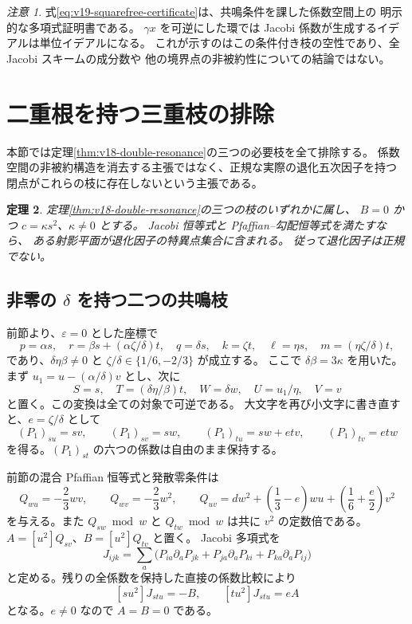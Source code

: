 \documentclass[11pt,a4paper]{ltjsarticle}
\newtheorem{theorem}{定理}[section]
\theoremstyle{remark}\newtheorem{remark}[theorem]{注意}
\begin{document}
\begin{remark}
式\eqref{eq:v19-squarefree-certificate}は、共鳴条件を課した係数空間上の
明示的な多項式証明書である。
$\gamma x$ を可逆にした環では Jacobi 係数が生成するイデアルは単位イデアルになる。
これが示すのはこの条件付き枝の空性であり、全 Jacobi スキームの成分数や
他の境界点の非被約性についての結論ではない。
\end{remark}


\section{二重根を持つ三重枝の排除}
\label{sec:v19-double-root}

本節では定理\ref{thm:v18-double-resonance}の三つの必要枝を全て排除する。
係数空間の非被約構造を消去する主張ではなく、正規な実際の退化五次因子を持つ
閉点がこれらの枝に存在しないという主張である。

\begin{theorem}\label{thm:v19-double-root}
定理\ref{thm:v18-double-resonance}の三つの枝のいずれかに属し、
$B=0$ かつ $c=\kappa s^2$、$\kappa\ne0$ とする。
Jacobi 恒等式と Pfaffian--勾配恒等式を満たすなら、
ある射影平面が退化因子の特異点集合に含まれる。
従って退化因子は正規でない。
\end{theorem}

\subsection{非零の \texorpdfstring{$\delta$}{delta} を持つ二つの共鳴枝}

前節より、$\varepsilon=0$ とした座標で
\[
 p=\alpha s,\quad r=\beta s+(\alpha\zeta/\delta)t,\quad
 q=\delta s,\quad k=\zeta t,\quad
 \ell=\eta s,\quad m=(\eta\zeta/\delta)t,
\]
であり、$\delta\eta\beta\ne0$ と
$\zeta/\delta\in\{1/6,-2/3\}$ が成立する。
ここで $\delta\beta=3\kappa$ を用いた。
まず $u_1=u-(\alpha/\delta)v$ とし、次に
\[
 S=s,\quad T=(\delta\eta/\beta)t,\quad
 W=\delta w,\quad U=u_1/\eta,\quad V=v
\]
と置く。この変換は全ての対象で可逆である。
大文字を再び小文字に書き直すと、$e=\zeta/\delta$ として
\begin{equation}\label{eq:v19-double-nonzero-jet}
 (P_1)_{su}=sv,\qquad (P_1)_{sv}=sw,\qquad
 (P_1)_{tu}=sw+etv,\qquad (P_1)_{tv}=etw
\end{equation}
を得る。$(P_1)_{st}$ の六つの係数は自由のまま保持する。

前節の混合 Pfaffian 恒等式と発散零条件は
\[
 Q_{wu}=-\frac23wv,\qquad Q_{wv}=-\frac23w^2,\qquad
 Q_{uv}=dw^2+\left(\frac13-e\right)wu
                   +\left(\frac16+\frac e2\right)v^2
\]
を与える。また $Q_{sw}\bmod w$ と $Q_{tw}\bmod w$ は共に $v^2$ の定数倍である。
$A=[u^2]Q_{sv}$、$B=[u^2]Q_{tv}$ と置く。
Jacobi 多項式を
\[
 J_{ijk}=\sum_a\bigl(P_{ia}\partial_aP_{jk}
                    +P_{ja}\partial_aP_{ki}
                    +P_{ka}\partial_aP_{ij}\bigr)
\]
と定める。残りの全係数を保持した直接の係数比較により
\begin{equation}\label{eq:v19-double-two-coefficients}
                       [su^2]J_{stu}=-B,
                 \qquad[tu^2]J_{stu}=eA
\end{equation}
となる。$e\ne0$ なので $A=B=0$ である。
\end{document}
